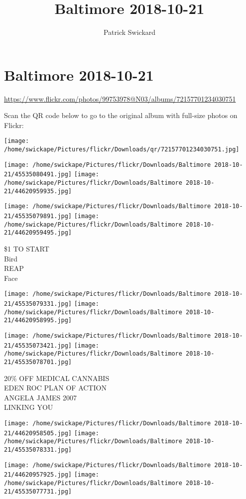 \documentclass[10pt,letterpaper]{article}
\title{Baltimore 2018-10-21}
\author{Patrick Swickard}
\date{}
\begin{document}
\section*{Baltimore 2018-10-21}

\url{https://www.flickr.com/photos/99753978@N03/albums/72157701234030751}

Scan the QR code below to go to the original album with full-size photos on Flickr:

\texttt{[image: /home/swickape/Pictures/flickr/Downloads/qr/72157701234030751.jpg]}
\pagebreak

\texttt{[image: /home/swickape/Pictures/flickr/Downloads/Baltimore 2018-10-21/45535080491.jpg]}
\texttt{[image: /home/swickape/Pictures/flickr/Downloads/Baltimore 2018-10-21/44620959935.jpg]}

\texttt{[image: /home/swickape/Pictures/flickr/Downloads/Baltimore 2018-10-21/45535079891.jpg]}
\texttt{[image: /home/swickape/Pictures/flickr/Downloads/Baltimore 2018-10-21/44620959495.jpg]}

\$1 TO START\\
Bird\\
REAP\\
Face
\pagebreak

\texttt{[image: /home/swickape/Pictures/flickr/Downloads/Baltimore 2018-10-21/45535079331.jpg]}
\texttt{[image: /home/swickape/Pictures/flickr/Downloads/Baltimore 2018-10-21/44620958995.jpg]}

\texttt{[image: /home/swickape/Pictures/flickr/Downloads/Baltimore 2018-10-21/45535073421.jpg]}
\texttt{[image: /home/swickape/Pictures/flickr/Downloads/Baltimore 2018-10-21/45535078701.jpg]}

20\% OFF MEDICAL CANNABIS\\
EDEN ROC PLAN OF ACTION\\
ANGELA JAMES 2007\\
LINKING YOU
\pagebreak

\texttt{[image: /home/swickape/Pictures/flickr/Downloads/Baltimore 2018-10-21/44620958505.jpg]}
\texttt{[image: /home/swickape/Pictures/flickr/Downloads/Baltimore 2018-10-21/45535078331.jpg]}

\texttt{[image: /home/swickape/Pictures/flickr/Downloads/Baltimore 2018-10-21/44620957925.jpg]}
\texttt{[image: /home/swickape/Pictures/flickr/Downloads/Baltimore 2018-10-21/45535077731.jpg]}
\end{document}
